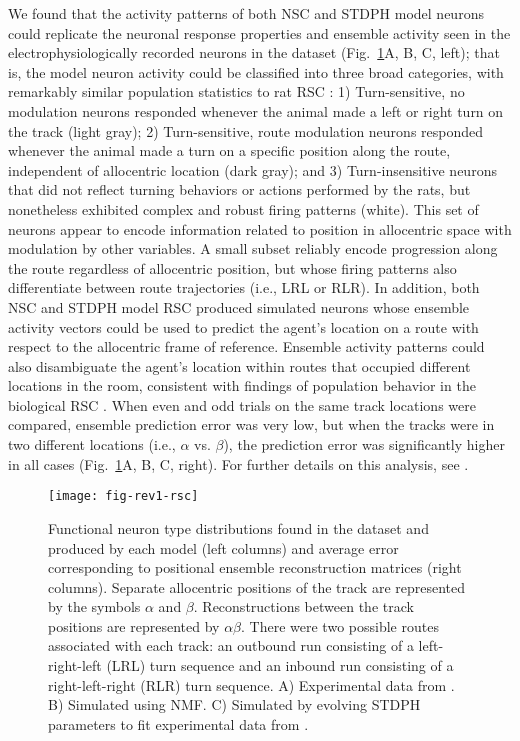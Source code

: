We found that the activity patterns of both \ac{NSC} and \ac{STDPH} model neurons could replicate the neuronal response properties and ensemble activity seen in the electrophysiologically recorded neurons in the dataset (Fig.~\ref{fig:NMF|RSC}A, B, C, left); that is, the model neuron activity could be classified into three broad categories,
with remarkably similar population statistics to rat \ac{RSC} 
\cite{AlexanderNitz2015}:
1) Turn-sensitive, no modulation neurons responded whenever the animal made a left or right turn
   on the track (light gray);
2) Turn-sensitive, route modulation neurons responded whenever the animal made a turn on a specific position along
   the route, independent of allocentric location (dark gray); and
3) Turn-insensitive neurons that did not reflect turning behaviors or actions performed by the rats,
   but nonetheless exhibited complex and robust firing patterns (white). This set of neurons appear to encode information related to position in allocentric space with modulation by other variables. A small subset reliably encode progression along the route regardless of allocentric position, but whose firing patterns also differentiate between route trajectories (i.e., LRL or RLR). In addition, both \ac{NSC} and \ac{STDPH} model \ac{RSC} produced simulated neurons whose ensemble activity vectors
could be used to predict the agent's location on a route with respect to the allocentric frame of reference. Ensemble activity patterns could also disambiguate the agent's location within routes that occupied different locations in the room, consistent with findings of population behavior in the biological RSC \cite{AlexanderNitz2015}.
When even and odd trials on the same track locations were compared,
ensemble prediction error was very low,
but when the tracks were in two different locations
(i.e., $\alpha$ vs. $\beta$),
the prediction error was significantly higher in all cases
(Fig.~\ref{fig:NMF|RSC}A, B, C, right).
For further details on this analysis, see \cite{AlexanderNitz2015,Rounds2016}.
   
\begin{figure}[ht]
	\centering
	\texttt{[image: fig-rev1-rsc]}
    \caption{Functional neuron type distributions found in the dataset and produced by each model (left columns) and average error corresponding to positional ensemble reconstruction matrices (right columns). Separate allocentric positions of the track are represented by the symbols $\alpha$ and $\beta$. Reconstructions between the track positions are represented by $\alpha$$\beta$. There were two possible routes associated with each track: an outbound run consisting of a left-right-left (LRL) turn sequence and an inbound run consisting of a right-left-right (RLR) turn sequence. A) Experimental data from \cite{AlexanderNitz2015}. B) Simulated using NMF. C) Simulated by evolving STDPH parameters to fit experimental data from \cite{Rounds2016}.}
	\label{fig:NMF|RSC}
\end{figure} 



